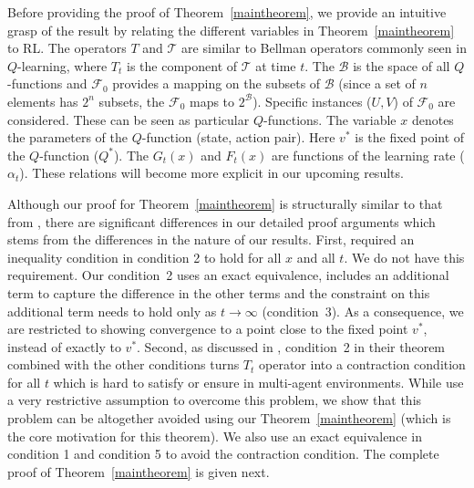 \documentclass[jair, twoside,11pt,theapa]{article}
\begin{document}
Before providing the proof of Theorem~\ref{maintheorem}, we  provide an intuitive grasp of the result by relating the different variables in Theorem~\ref{maintheorem} to RL. The operators $T$ and $\mathcal{T}$ are similar to Bellman operators commonly seen in $Q$-learning, where $T_t$ is the component of $\mathcal{T}$ at time $t$. The $\mathcal{B}$ is the space of all $Q$-functions and $\mathcal{F}_0$ provides a mapping on the subsets of $\mathcal{B}$ (since a set of $n$ elements has $2^n$ subsets, the $\mathcal{F}_0$ maps to $2^{\mathcal{B}}$). Specific instances ($U,V$) of $\mathcal{F}_0$ are considered. These can be seen as particular $Q$-functions. The variable $x$ denotes the parameters of the $Q$-function (state, action pair). Here $v^*$ is the fixed point of the $Q$-function ($Q^*$). The $G_t(x)$ and $F_t(x)$ are functions of the learning rate ($\alpha_t$). These relations will become more explicit in our upcoming results. 


Although our proof for Theorem~\ref{maintheorem} is structurally similar to that from \citet{szepesvari1999unified},  there are significant differences in our detailed proof arguments which stems from the differences in the nature of our results. First, \citet{szepesvari1999unified} required an inequality condition in condition 2 to hold for all $x$ and all $t$. 
We do not have this requirement. Our condition~2 uses an exact equivalence, includes an additional term to capture the difference in the other terms and the constraint on this additional term needs to hold only as $t\xrightarrow{} \infty$ (condition~3). As a consequence, we are restricted to showing convergence to a point close to the fixed point $v^*$, instead of exactly to $v^*$. Second, as discussed in \citet{szepesvari1999unified}, condition~2 in their theorem combined with the other conditions turns $T_t$ operator into a contraction condition for all $t$ which is hard to satisfy or ensure in multi-agent environments. While \citet{hu2003nash} use a very restrictive assumption to overcome this problem, we show that this problem can be altogether avoided using our Theorem~\ref{maintheorem} (which is the core motivation for this theorem).
We also use an exact equivalence in condition 1 and condition 5 to avoid the contraction condition. The complete proof of Theorem~\ref{maintheorem} is given next. 
\end{document}
